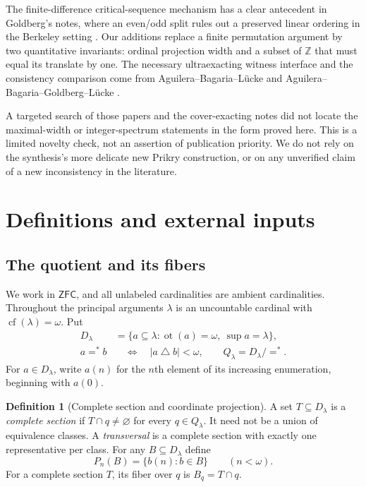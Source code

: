 \documentclass[11pt,letterpaper]{article}
\theoremstyle{definition}
\newtheorem{definition}{Definition}[section]
\newcommand{\ZFC}{\mathsf{ZFC}}
\newcommand{\cf}{\operatorname{cf}}
\newcommand{\ot}{\operatorname{ot}}
\numberwithin{equation}{section}
\newcommand{\ZZ}{\mathbb Z}
\newcommand{\symdiff}{\mathbin{\triangle}}
\newcommand{\eqfin}{\mathrel{=^{*}}}
\begin{document}
The finite-difference critical-sequence mechanism has a clear antecedent in Goldberg's notes, where an even/odd split rules out a preserved linear ordering in the Berkeley setting \cite[Remark~2.4]{cover}. Our additions replace a finite permutation argument by two quantitative invariants: ordinal projection width and a subset of $\ZZ$ that must equal its translate by one. The necessary ultraexacting witness interface and the consistency comparison come from Aguilera--Bagaria--L\"ucke and Aguilera--Bagaria--Goldberg--L\"ucke \cite{abl,abgl}.

A targeted search of those papers and the cover-exacting notes did not locate the maximal-width or integer-spectrum statements in the form proved here. This is a limited novelty check, not an assertion of publication priority. We do not rely on the synthesis's more delicate new Prikry construction, or on any unverified claim of a new inconsistency in the literature.

\section{Definitions and external inputs}\label{sec:setup}

\subsection{The quotient and its fibers}

We work in $\ZFC$, and all unlabeled cardinalities are ambient cardinalities. Throughout the principal arguments $\lambda$ is an uncountable cardinal with $\cf(\lambda)=\omega$. Put
\begin{align}
D_\lambda&=\{a\subseteq\lambda:\ot(a)=\omega,\ \sup a=\lambda\},\label{eq:D}\\
a\eqfin b&\quad\Longleftrightarrow\quad |a\symdiff b|<\omega,\qquad
Q_\lambda=D_\lambda/{=^{*}}.\label{eq:Q}
\end{align}
For $a\in D_\lambda$, write $a(n)$ for the $n$th element of its increasing enumeration, beginning with $a(0)$.

\begin{definition}[Complete section and coordinate projection]\label{def:section}
A set $T\subseteq D_\lambda$ is a \emph{complete section} if $T\cap q\ne\varnothing$ for every $q\in Q_\lambda$. It need not be a union of equivalence classes. A \emph{transversal} is a complete section with exactly one representative per class. For any $B\subseteq D_\lambda$ define
\[
P_n(B)=\{b(n):b\in B\}\qquad(n<\omega).
\]
For a complete section $T$, its fiber over $q$ is $B_q=T\cap q$.
\end{definition}
\end{document}
